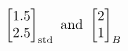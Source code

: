 \documentclass[preview]{standalone}
\begin{document}
\begin{align*}
\begin{bmatrix}1.5\\2.5\end{bmatrix}_{\rm std} \text{ and } \begin{bmatrix}2\\1\end{bmatrix}_{B}
\end{align*}
\end{document}
